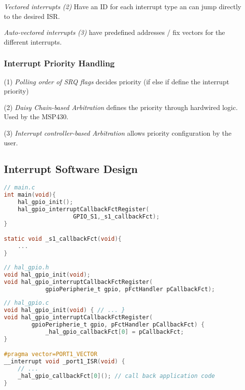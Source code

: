 \textit{Vectored interrupts (2)} Have an ID for each interrupt type an can jump directly to the desired ISR.

\textit{Auto-vectored interrupts (3)} have predefined addresses / fix vectors for the different interrupts.

\subsubsection{Interrupt Priority Handling }
(1) \textit{Polling order of SRQ flags} decides priority (if else if define the interrupt priority)

(2) \textit{Daisy Chain-based Arbitration} defines the priority through hardwired logic. Used by the MSP430.

(3) \textit{Interrupt controller-based Arbitration} allows priority configuration by the user.

\subsection{Interrupt Software Design }
\begin{lstlisting}[language=c]
// main.c
int main(void){
	hal_gpio_init();
	hal_gpio_interruptCallbackFctRegister(
					GPIO_S1,_s1_callbackFct);
}

static void _s1_callbackFct(void){
	...
}
\end{lstlisting}\vspace{-25px}
\begin{lstlisting}[language=c]
// hal_gpio.h
void hal_gpio_init(void);
void hal_gpio_interruptCallbackFctRegister(
			gpioPeripherie_t gpio, pFctHandler pCallbackFct);
\end{lstlisting}\vspace{-25px}
\begin{lstlisting}[language=c]
// hal_gpio.c
void hal_gpio_init(void) { // ... }
void hal_gpio_interruptCallbackFctRegister(
		gpioPeripherie_t gpio, pFctHandler pCallbackFct) {
			_hal_gpio_callbackFct[0] = pCallbackFct;
}

#pragma vector=PORT1_VECTOR
__interrupt void _port1_ISR(void) {
	// ...
	_hal_gpio_callbackFct[0](); // call back application code
}
\end{lstlisting}\vspace{-25px}




